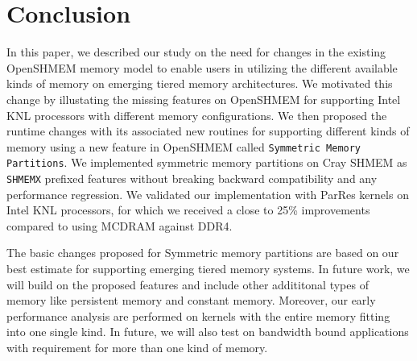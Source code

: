 \section{Conclusion}
\label{src:conclusion}
In this paper, we described our study on the need for
changes in
the existing OpenSHMEM memory model to enable users in
utilizing
the different available kinds of memory on emerging tiered
memory architectures. We motivated this change
by illustating the missing features on OpenSHMEM for
supporting Intel KNL processors with different memory
configurations.
We then proposed the runtime
changes with its associated new routines %
for
supporting different kinds of memory using a new feature in
OpenSHMEM called \texttt{Symmetric Memory Partitions}.
We implemented
symmetric memory partitions on Cray SHMEM as
\texttt{SHMEMX} prefixed features without breaking
backward compatibility and any performance regression.
We validated our implementation with ParRes kernels on Intel
KNL processors, for which we received a close to 25\%
improvements compared to using MCDRAM against DDR4.

The basic changes proposed for Symmetric memory partitions
are based on our best estimate for supporting emerging tiered
memory systems. In future work, we will build on the proposed
features and include other addititonal types of memory like
persistent memory and constant memory. Moreover, our early
performance analysis are performed on kernels with the
entire memory fitting into one single kind. In future, we will
also test on bandwidth bound applications with requirement
for more than one kind of memory.
